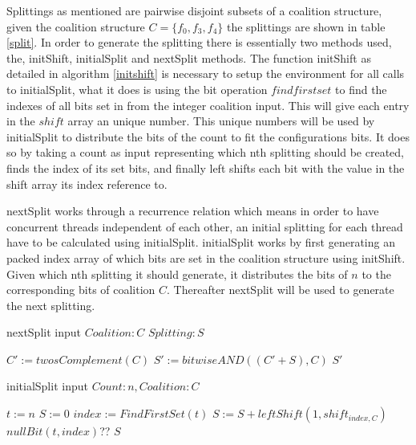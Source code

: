\documentclass{aamas2012}
\begin{document}
Splittings as mentioned are pairwise disjoint subsets of a coalition structure, 
given the coalition structure $C = \{f_0,f_3,f_4\}$ the splittings
are shown in table \ref{split}. In order to generate the splitting there is essentially two methods used, 
the, initShift, initialSplit and nextSplit methods. 
The function initShift as detailed in algorithm \ref{initshift} is necessary to setup the environment for 
all calls to initialSplit, what it does is using the bit operation $find first set$ to find the indexes of all bits set
in from the integer coalition input. This will give each entry in the $shift$ array an unique number. 
This unique numbers will be used by initialSplit to distribute the bits of the count to fit the configurations bits.
It does so by taking a count as input representing which nth splitting should be created, finds the index of its 
set bits, and finally left shifts each bit with the value in the shift array its index reference to.

nextSplit works through a recurrence relation which means in order to have 
concurrent threads independent of each other, an initial splitting for each thread have to be calculated using initialSplit. 
initialSplit works by first generating an packed index array of which bits are set in the coalition structure using initShift.
Given which nth splitting it should generate, it distributes the bits of $n$ to the corresponding bits of coalition $C$. 
Thereafter nextSplit will be used to generate the next splitting. 



\begin{algorithm}
\caption{ nextSplit input $Coalition:C$ $Splitting:S$}
\begin{algorithmic}[1]
\STATE $C' := twosComplement(C)$
\STATE $S' := bitwiseAND((C'+S),C)$
\RETURN $S'$
\end{algorithmic}
\end{algorithm}

\begin{algorithm}
\caption{initialSplit input $Count:n, Coalition:C$}
\begin{algorithmic}[1]
\STATE $t := n$
\STATE $S := 0$
 {
\STATE $index := FindFirstSet(t)$
\STATE $S := S + leftShift(1,shift_{index,C})$
\STATE $nullBit(t,index)$??
}
\ENDWHILE
\RETURN $S$
\end{algorithmic}
\end{algorithm}
\end{document}
